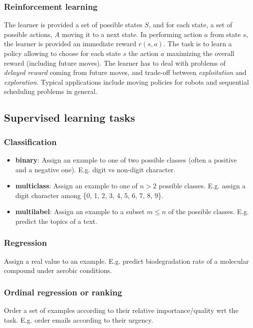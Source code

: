 \documentclass[a4paper, 10pt, titlepage]{article}
\begin{document}
\subsubsection{Reinforcement learning}
The learner is provided a set of possible states $S$, and for each state, a set of possible actions, $A$ moving it to a next state.
In performing action $a$ from state $s$, the learner is provided an immediate reward $r(s, a)$.
The task is to learn a policy allowing to choose for each state $s$ the action $a$ maximizing the overall reward (including future moves).
The learner has to deal with problems of \textit{delayed reward} coming from future moves, and trade-off between
\textit{exploitation} and \textit{exploration}.
Typical applications include moving policies for robots and sequential scheduling problems in general.

\subsection{Supervised learning tasks}
\subsubsection{Classification}
\begin{itemize}
\item \textbf{binary}: Assign an example to one of two possible classes (often a positive and a negative one). E.g. digit vs non-digit
character.
\item \textbf{multiclass}: Assign an example to one of $n > 2$ possible classes. E.g. assign a digit character among \{0, 1, 2, 3, 4, 5, 6, 7, 8, 9\}.
\item \textbf{multilabel}: Assign an example to a subset $m \leq n$ of the possible classes. E.g. predict the topics of a text.
\end{itemize}

\subsubsection{Regression}
Assign a real value to an example. E.g. predict biodegradation rate of a molecular compound under aerobic conditions.

\subsubsection{Ordinal regression or ranking}
Order a set of examples according to their relative importance/quality wrt the task. E.g. order emails according to
their urgency.
\end{document}
